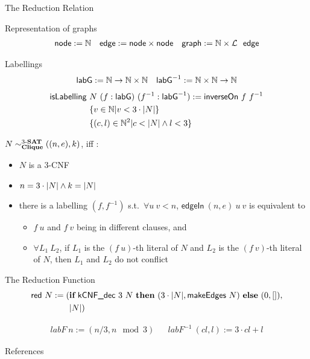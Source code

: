 \documentclass[11pt,usenames,dvipsnames,
  hyperref={pdfencoding=auto,psdextra}]{beamer}
\begin{document}
\begin{frame}[allowframebreaks]{The Reduction Relation}
  \begin{block}{Representation of graphs}
    \vspace{-4ex}
      \begin{align*}
        \textsf{node} := \mathbb{N} &&
        \textsf{edge} := \textsf{node} \times \textsf{node} &&
        \textsf{graph} := \mathbb{N} \times \mathcal{L}~~\textsf{edge} 
      \end{align*}
  \end{block}

  \begin{block}{Labellings}
    \vspace{-3ex}
 \begin{align*}
  \normalfont\textsf{labG} := \mathbb{N} \rightarrow \mathbb{N} \times \mathbb{N} && \normalfont\textsf{labG}^{-1} := \mathbb{N} \times \mathbb{N} \rightarrow \mathbb{N}
  \end{align*}
  \vspace{-4ex}
  \begin{align*}
    \normalfont\textsf{isLabelling}~&N~(f : \normalfont\textsf{labG})~(f^{-1} : \normalfont\textsf{labG}^{-1}) := \normalfont\textsf{inverseOn}~f~f^{-1}\\
  &\{ v \in \mathbb{N} | v < 3 \cdot |N|\} \\
    ~&\{(c, l) \in \mathbb{N}^2 | c < |N| \land l < 3\} 
\end{align*}
  \end{block}

  \pagebreak

  $N \sim^{\text{3-\textbf{SAT}}}_{\textbf{Clique}} ((n, e), k)$, iff :
  \begin{itemize}
    \item $N$ is a 3-CNF
    \item $n = 3 \cdot |N| \land k = |N|$
    \item there is a labelling $(f, f^{-1})$ s.t.\ $\forall u~v < n$, $\textsf{edgeIn}~(n, e)~u~v$ is equivalent to 
      \begin{itemize}
        \item $f~u$ and $f~v$ being in different clauses, and
        \item $\forall L_1~L_2$, if $L_1$ is the $(f~u)$-th literal of $N$ and $L_2$ is the $(f~v)$-th literal of $N$, then $L_1$ and $L_2$ do not conflict
      \end{itemize}
  \end{itemize}
\end{frame}

\begin{frame}{The Reduction Function}
  \begin{align*}
    \textsf{red}~N := (&\textbf{if}~{\textsf{kCNF\_dec}~3~N}~\textbf{then}~{(3 \cdot |N|, \textsf{makeEdges}~N)}~\textbf{else}~{(0, [])}, \\
    &|N|)
  \end{align*}

  \begin{align*}
    \mathit{labF}~n := (n/3, n \mod 3) && \mathit{labF}^{-1}~(cl, l) := 3 \cdot cl + l
  \end{align*}
\end{frame}

\begin{frame}[allowframebreaks]{References}
  \nocite{Sipser:TheoryofComputation}
  \nocite{Bläser:TISkript}
  
  {}
\end{frame}
\end{document}

